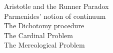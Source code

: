 \documentclass[preview]{standalone}
\begin{document}
Aristotle and the Runner Paradox\\Parmenides' notion of continuum\\The Dichotomy procedure\\The Cardinal Problem\\The Mereological Problem\\
\end{document}

